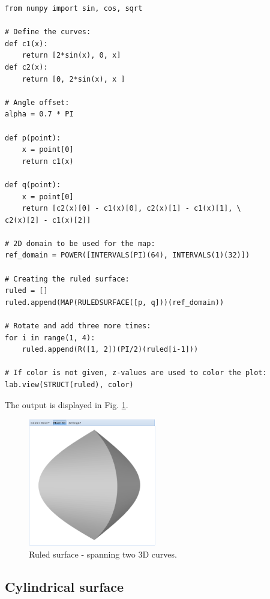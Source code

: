 \documentclass[article,A4,12pt]{llncs}
\begin{document}
\begin{verbatim}
from numpy import sin, cos, sqrt

# Define the curves:
def c1(x):
    return [2*sin(x), 0, x]
def c2(x):
    return [0, 2*sin(x), x ]
  
# Angle offset:
alpha = 0.7 * PI

def p(point):
    x = point[0]
    return c1(x)
  
def q(point):
    x = point[0]
    return [c2(x)[0] - c1(x)[0], c2(x)[1] - c1(x)[1], \
c2(x)[2] - c1(x)[2]]
  
# 2D domain to be used for the map:  
ref_domain = POWER([INTERVALS(PI)(64), INTERVALS(1)(32)])

# Creating the ruled surface:
ruled = []
ruled.append(MAP(RULEDSURFACE([p, q]))(ref_domain))

# Rotate and add three more times:
for i in range(1, 4):
    ruled.append(R([1, 2])(PI/2)(ruled[i-1]))

# If color is not given, z-values are used to color the plot:
lab.view(STRUCT(ruled), color)
\end{verbatim}
The output is displayed in Fig. \ref{fig:curves-10}.

\newpage

\begin{figure}[!ht]
\begin{center}
\includegraphics[width=0.5\textwidth]{img/curves-10.png}
\end{center}
\vspace{-2mm}
\caption{Ruled surface - spanning two 3D curves.}
\label{fig:curves-10}
\end{figure}


\subsection{Cylindrical surface}
\end{document}
